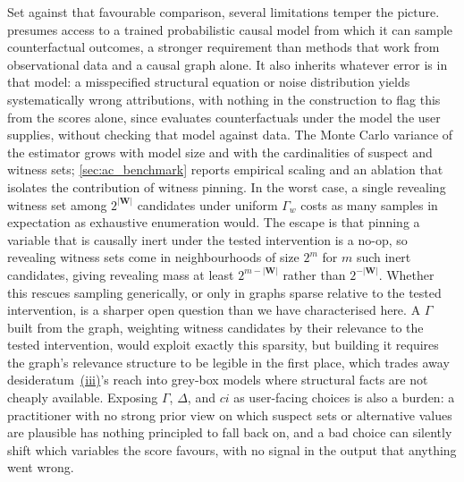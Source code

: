 Set against that favourable comparison, several limitations temper the picture.
\Ourapproach presumes access to a trained
probabilistic causal model from which it can sample counterfactual outcomes, a
stronger requirement than methods that work from observational data and a causal graph
alone. It also inherits whatever error is in that model: a misspecified structural
equation or noise distribution yields systematically wrong attributions, with
nothing in the construction to flag this from the scores alone, since \ourapproach
evaluates counterfactuals under the model the user supplies, without checking that
model against data. The Monte Carlo variance of the estimator grows with model size and with the
cardinalities of suspect and witness sets; \cref{sec:ac_benchmark} reports
empirical scaling and an ablation that isolates the contribution of witness pinning.
In the worst case, a single revealing witness set among $2^{|\mathbf{W}|}$ candidates
under uniform $\Gamma_w$ costs as many samples in expectation as exhaustive
enumeration would. The escape is that pinning a variable that is causally inert under
the tested intervention is a no-op, so revealing witness sets come in neighbourhoods
of size $2^m$ for $m$ such inert candidates, giving revealing mass at least
$2^{m-|\mathbf{W}|}$ rather than $2^{-|\mathbf{W}|}$. Whether this rescues sampling
generically, or only in graphs sparse relative to the tested intervention, is a
sharper open question than we have characterised here. A $\Gamma$ built from the
graph, weighting witness candidates by their relevance to the tested intervention,
would exploit exactly this sparsity, but building it requires
the graph's relevance structure to be legible in the first place, which trades away
desideratum~\hyperref[des:broad]{(iii)}'s reach into grey-box models where structural
facts are not cheaply available.
Exposing $\Gamma$, $\Delta$, and $ci$ as user-facing choices is also a burden:
a practitioner with no strong prior view on which suspect sets or alternative values are plausible has nothing
principled to fall back on, and a bad choice can silently shift which variables
the score favours, with no signal in the output that anything went wrong.

